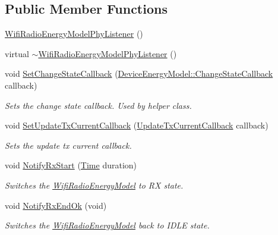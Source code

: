 \subsection*{Public Member Functions}
\begin{DoxyCompactItemize}
\item 
\hyperlink{classns3_1_1WifiRadioEnergyModelPhyListener_a105af33f3679404721a590d8723fff8d}{Wifi\+Radio\+Energy\+Model\+Phy\+Listener} ()
\item 
virtual \hyperlink{classns3_1_1WifiRadioEnergyModelPhyListener_a91c37af98751c0547b51e4c7cb9eb6e2}{$\sim$\+Wifi\+Radio\+Energy\+Model\+Phy\+Listener} ()
\item 
void \hyperlink{classns3_1_1WifiRadioEnergyModelPhyListener_ac4c2d392a79f3f9ea60cf991a8894448}{Set\+Change\+State\+Callback} (\hyperlink{classns3_1_1DeviceEnergyModel_a26632ed1b86ee8f6c7fc4c756f0027ad}{Device\+Energy\+Model\+::\+Change\+State\+Callback} callback)
\begin{DoxyCompactList}\small\item\em Sets the change state callback. Used by helper class. \end{DoxyCompactList}\item 
void \hyperlink{classns3_1_1WifiRadioEnergyModelPhyListener_a95c5f8c236d73b8d6d94d172720d5c79}{Set\+Update\+Tx\+Current\+Callback} (\hyperlink{classns3_1_1WifiRadioEnergyModelPhyListener_a0263a4adc144a5406f9b4b504e7a7a16}{Update\+Tx\+Current\+Callback} callback)
\begin{DoxyCompactList}\small\item\em Sets the update tx current callback. \end{DoxyCompactList}\item 
void \hyperlink{classns3_1_1WifiRadioEnergyModelPhyListener_a2b61218501f774b461acb14e60e82e1e}{Notify\+Rx\+Start} (\hyperlink{classns3_1_1Time}{Time} duration)
\begin{DoxyCompactList}\small\item\em Switches the \hyperlink{classns3_1_1WifiRadioEnergyModel}{Wifi\+Radio\+Energy\+Model} to RX state. \end{DoxyCompactList}\item 
void \hyperlink{classns3_1_1WifiRadioEnergyModelPhyListener_a51cdf4da27c5ddc6aea62c4feb306d80}{Notify\+Rx\+End\+Ok} (void)
\begin{DoxyCompactList}\small\item\em Switches the \hyperlink{classns3_1_1WifiRadioEnergyModel}{Wifi\+Radio\+Energy\+Model} back to I\+D\+LE state. \end{DoxyCompactList}\item 

\end{DoxyCompactItemize}

